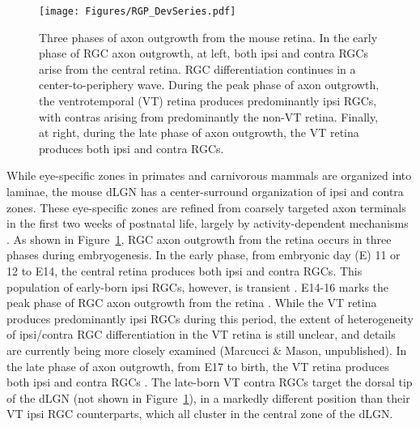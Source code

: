 \begin{figure}[hbtp]
    \begin{center}
        \texttt{[image: Figures/RGP\_DevSeries.pdf]}
        \caption[Three phases of axon outgrowth from the mouse retina.]
        {Three phases of axon outgrowth from the mouse retina.
        In the early phase of RGC axon outgrowth, at left, both ipsi and contra RGCs arise from the central retina.
        RGC differentiation continues in a center-to-periphery wave.
        During the peak phase of axon outgrowth, the ventrotemporal (VT) retina produces predominantly ipsi RGCs, with contras arising from predominantly the non-VT retina.
        Finally, at right, during the late phase of axon outgrowth, the VT retina produces both ipsi and contra RGCs.}
        \label{Figures/RGPDevSeries}
    \end{center}
\end{figure}
While eye-specific zones in primates and carnivorous mammals are organized into laminae, the mouse dLGN has a center-surround organization of ipsi and contra zones.
These eye-specific zones are refined from coarsely targeted axon terminals in the first two weeks of postnatal life, largely by activity-dependent mechanisms \cite{huberman2008mechanisms,feldheim2010visual}.
As shown in Figure~\ref{Figures/RGPDevSeries}, RGC axon outgrowth from the retina occurs in three phases during embryogenesis.
In the early phase, from embryonic day (E) 11 or 12 to E14, the central retina produces both ipsi and contra RGCs.
This population of early-born ipsi RGCs, however, is transient \cite{drager1985birth,colello1990early,soares2015transient}.
E14-16 marks the peak phase of RGC axon outgrowth from the retina \cite{drager1985birth,petros2008retinal}.
While the VT retina produces predominantly ipsi RGCs during this period, the extent of heterogeneity of ipsi/contra RGC differentiation in the VT retina is still unclear, and details are currently being more closely examined (Marcucci \& Mason, unpublished).
In the late phase of axon outgrowth, from E17 to birth, the VT retina produces both ipsi and contra RGCs \cite{drager1985birth,petros2008retinal}.
The late-born VT contra RGCs target the dorsal tip of the dLGN (not shown in Figure~\ref{Figures/RGPDevSeries}), in a markedly different position than their VT ipsi RGC counterparts, which all cluster in the central zone of the dLGN.
